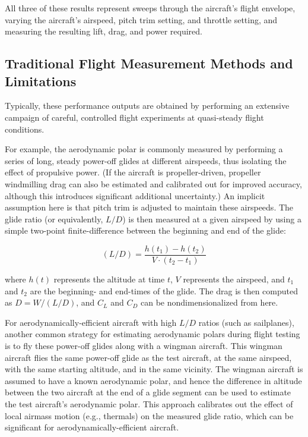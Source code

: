 \documentclass[conf]{new-aiaa}
\begin{document}
    All three of these results represent sweeps through the aircraft's flight envelope, varying the aircraft's airspeed, pitch trim setting, and throttle setting, and measuring the resulting lift, drag, and power required.

    \subsection{Traditional Flight Measurement Methods and Limitations}

    Typically, these performance outputs are obtained by performing an extensive campaign of careful, controlled flight experiments at quasi-steady flight conditions.

    For example, the aerodynamic polar is commonly measured by performing a series of long, steady power-off glides at different airspeeds, thus isolating the effect of propulsive power. (If the aircraft is propeller-driven, propeller windmilling drag can also be estimated and calibrated out for improved accuracy, although this introduces significant additional uncertainty.) An implicit assumption here is that pitch trim is adjusted to maintain these airspeeds. The glide ratio (or equivalently, $L/D$) is then measured at a given airspeed by using a simple two-point finite-difference between the beginning and end of the glide:

    $$(L/D) = \frac{h(t_1) - h(t_2)}{V \cdot (t_2 - t_1)}$$

    where $h(t)$ represents the altitude at time $t$, $V$ represents the airspeed, and $t_1$ and $t_2$ are the beginning- and end-times of the glide. The drag is then computed as $D = W / (L/D)$, and $C_L$ and $C_D$ can be nondimensionalized from here.

    For aerodynamically-efficient aircraft with high $L/D$ ratios (such as sailplanes), another common strategy for estimating aerodynamic polars during flight testing is to fly these power-off glides along with a wingman aircraft. This wingman aircraft flies the same power-off glide as the test aircraft, at the same airspeed, with the same starting altitude, and in the same vicinity. The wingman aircraft is assumed to have a known aerodynamic polar, and hence the difference in altitude between the two aircraft at the end of a glide segment can be used to estimate the test aircraft's aerodynamic polar. This approach calibrates out the effect of local airmass motion (e.g., thermals) on the measured glide ratio, which can be significant for aerodynamically-efficient aircraft.
\end{document}
